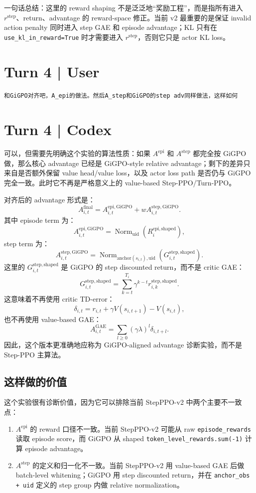 \documentclass[10pt]{ctexart}
\newcommand{\code}[1]{\texttt{#1}}
\begin{document}
一句话总结：这里的 reward shaping 不是泛泛地“奖励工程”，而是指所有进入 \(r^{\mathrm{step}}\)、return、advantage 的 reward-space 修正。当前 v2 最重要的是保证 invalid action penalty 同时进入 step GAE 和 episode advantage；KL 只有在 \code{use\_kl\_in\_reward=True} 时才需要进入 \(r^{\mathrm{step}}\)，否则它只是 actor KL loss。

\section*{Turn 4 | User}
\begin{Verbatim}[breaklines=true,breakanywhere=true]
和GiGPO对齐吧，A_epi的做法。然后A_step和GiGPO的step adv同样做法，这样如何
\end{Verbatim}

\section*{Turn 4 | Codex}
可以，但需要先明确这个实验的算法性质：如果 \(A^{\mathrm{epi}}\) 和 \(A^{\mathrm{step}}\) 都完全按 GiGPO 做，那么核心 advantage 已经是 GiGPO-style relative advantage；剩下的差异只来自是否额外保留 value head/value loss，以及 actor loss path 是否仍与 GiGPO 完全一致。此时它不再是严格意义上的 value-based Step-PPO/Turn-PPO。

对齐后的 advantage 形式是：
\[
A_{i,t}^{\mathrm{final}}
=
A_{i,t}^{\mathrm{epi,GiGPO}}
+wA_{i,t}^{\mathrm{step,GiGPO}}.
\]
其中 episode term 为：
\[
A_{i,t}^{\mathrm{epi,GiGPO}}
=
\operatorname{Norm}_{\mathrm{uid}}\left(R_i^{\mathrm{epi,shaped}}\right),
\]
step term 为：
\[
A_{i,t}^{\mathrm{step,GiGPO}}
=
\operatorname{Norm}_{\mathrm{anchor}(s_{i,t}),\mathrm{uid}}
\left(G_{i,t}^{\mathrm{step,shaped}}\right).
\]
这里的 \(G_{i,t}^{\mathrm{step,shaped}}\) 是 GiGPO 的 step discounted return，而不是 critic GAE：
\[
G_{i,t}^{\mathrm{step,shaped}}
=
\sum_{k=t}^{T_i}\gamma^{k-t}r_{i,k}^{\mathrm{step,shaped}}.
\]
这意味着不再使用 critic TD-error：
\[
\delta_{i,t}=r_{i,t}+\gamma V(s_{i,t+1})-V(s_{i,t}),
\]
也不再使用 value-based GAE：
\[
A_{i,t}^{\mathrm{GAE}}
=
\sum_{l\ge 0}(\gamma\lambda)^l\delta_{i,t+l}.
\]
因此，这个版本更准确地应称为 GiGPO-aligned advantage 诊断实验，而不是 Step-PPO 主算法。

\subsection*{这样做的价值}
这个实验很有诊断价值，因为它可以排除当前 StepPPO-v2 中两个主要不一致点：
\begin{enumerate}
  \item \(A^{\mathrm{epi}}\) 的 reward 口径不一致。当前 StepPPO-v2 可能从 raw \code{episode\_rewards} 读取 episode score，而 GiGPO 从 shaped \code{token\_level\_rewards.sum(-1)} 计算 episode advantage。
  \item \(A^{\mathrm{step}}\) 的定义和归一化不一致。当前 StepPPO-v2 用 value-based GAE 后做 batch-level whitening；GiGPO 用 step discounted return，并在 \code{anchor\_obs + uid} 定义的 step group 内做 relative normalization。
\end{enumerate}
\end{document}
